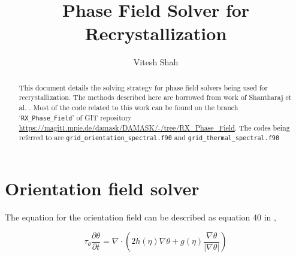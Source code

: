 \documentclass[a4paper,11pt,dvipsnames]{article}
\title{\textbf{Phase Field Solver for Recrystallization}}
\author{Vitesh Shah}
\begin{document}
\nonstopmode
\begin{titlingpage}
	\maketitle
	\begin{abstract}
	This document details the solving strategy for phase field solvers being used for recrystallization. 
    The methods described here are borrowed from work of Shantharaj et al. \cite{Shanthraj2019}. 
    Most of the code related to this work can be found on the branch `\verb|RX_Phase_Field|' of GIT repository 
    \url{https://magit1.mpie.de/damask/DAMASK/-/tree/RX_Phase_Field}. 
    The codes being referred to are \verb|grid_orientation_spectral.f90| and 
    \verb|grid_thermal_spectral.f90|
	\end{abstract}
\end{titlingpage}

\newcommand\mathsym[1]{\begin{math} {#1} \end{math}}
\newcommand{\Tau}{\mathrm{T}}

\section{Orientation field solver}
The equation for the orientation field can be described as equation 40 in \cite{Abrivard2012b},

\begin{equation}
    \tau_\theta \frac{\partial \theta}{\partial t} = \nabla \cdot \left ( 2h(\eta) \nabla \theta + g(\eta) \frac{\nabla \theta}{\left | \nabla \theta \right |} \right ) \label{eq:1} 
\end{equation}

\end{document}
